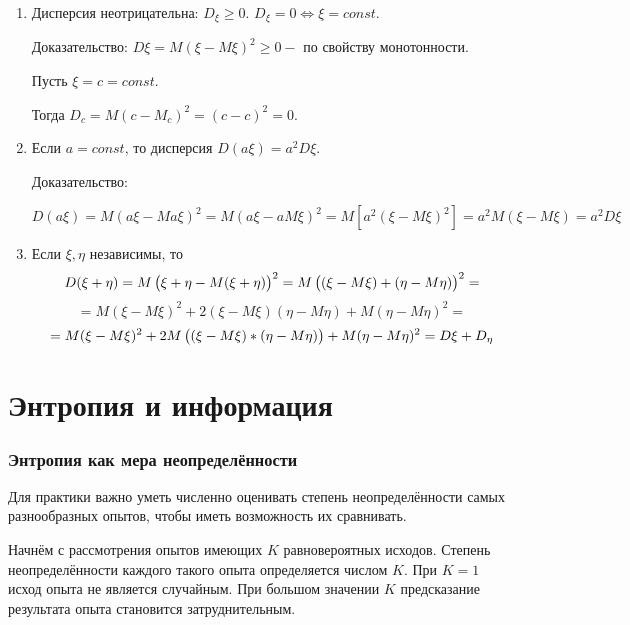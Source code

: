 ﻿\documentclass[a4paper,12pt]{report}
\begin{document}
	\begin{enumerate}

	\item	Дисперсия неотрицательна: $D_\xi \ge 0.$ $D_\xi = 0 \Longleftrightarrow \xi = const$. 
		
		Доказательство: $D\xi = M(\xi-M\xi)^2 \ge 0 - $ по свойству монотонности.
		
		Пусть $\xi = c = const$.
		
		Тогда $D_c = M(c-M_c)^2 =(c - c)^2 = 0$.


	\item	Если $a = const$, то дисперсия $D(a\xi) = a^2 D\xi$. 
	
		Доказательство: 
		
		$D(a\xi) = M(a\xi - Ma\xi)^2
		         = M(a\xi - a M\xi)^2
		         = M[a^2 (\xi-M\xi)^2]
		         = a^2 M(\xi - M\xi)
		         = a^2 D\xi
		$
		

	\item	Если $\xi,\eta$ независимы, то 
		$$
		  D(\xi + \eta) = M\left(  \xi \strut + \eta - M(\xi +\eta)    \right)^2 
		                = M\left( (\xi - M\xi) \strut + (\eta - M\eta) \right)^2
		                =
		$$ $$		                
		                = M(\xi - M\xi)^2 + 2(\xi-M\xi)(\eta - M\eta) + M(\eta - M\eta)^2
		                =
		$$ $$
		                = M(\xi - M\xi)^2 + 2M\left( (\xi - M\xi) \strut * (\eta - M\eta)\right) 
		                  + M(\eta - M\eta)^2
		                = D\xi + D_\eta
		$$
	
	\end{enumerate}
	
	
	
	

\section{Энтропия и информация}

\subsubsection{Энтропия как мера неопределённости}

	Для практики важно уметь численно оценивать степень неопределённости самых разнообразных опытов, чтобы иметь возможность их сравнивать. 
	
	Начнём с рассмотрения опытов имеющих $K$ равновероятных исходов. Степень неопределённости каждого такого опыта определяется числом $K$. При $K = 1$ исход опыта не является случайным. При большом значении $K$ предсказание результата опыта становится затруднительным.
	
\end{document}

